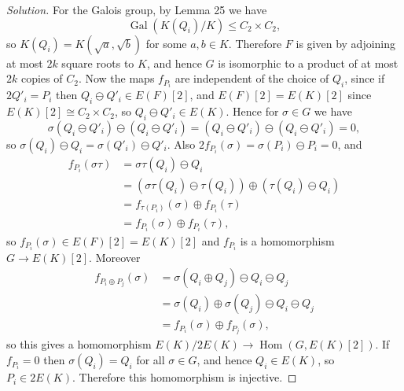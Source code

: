\documentclass[a4paper]{article}
\theoremstyle{definition}
\DeclareMathOperator{\Hom}{Hom}
\DeclareMathOperator{\Gal}{Gal}
\begin{document}
\begin{enumerate}
        \begin{proof}[Solution]
            For the Galois group, by Lemma 25 we have
            \begin{equation*}
                \Gal(K(Q_i)/K)\le C_2\times C_2,
            \end{equation*}
            so $K(Q_i)=K(\sqrt a,\sqrt b)$ for some $a,b\in K$. Therefore $F$ is
            given by adjoining at most $2k$ square roots to $K$, and hence $G$
            is isomorphic to a product of at most $2k$ copies of $C_2$. Now the
            maps $f_{P_i}$ are independent of the choice of $Q_i$, since if
            $2Q'_i=P_i$ then $Q_i\ominus Q'_i\in E(F)[2]$, and $E(F)[2]=E(K)[2]$
            since $E(K)[2]\cong C_2\times C_2$, so $Q_i\ominus Q'_i\in E(K)$.
            Hence for $\sigma\in G$ we have
            \begin{equation*}
                \sigma(Q_i\ominus Q'_i)\ominus(Q_i\ominus Q'_i)
                    = (Q_i\ominus Q'_i)\ominus(Q_i\ominus Q'_i)
                    = 0,
            \end{equation*}
            so $\sigma(Q_i)\ominus Q_i=\sigma(Q'_i)\ominus Q'_i$. Also
            $2f_{P_i}(\sigma)=\sigma(P_i)\ominus P_i=0$, and
            \begin{align*}
                f_{P_i}(\sigma\tau)
                    &= \sigma\tau(Q_i)\ominus Q_i \\
                    &= (\sigma\tau(Q_i)\ominus\tau(Q_i))
                        \oplus (\tau(Q_i)\ominus Q_i) \\
                    &= f_{\tau(P_i)}(\sigma) \oplus f_{P_i}(\tau) \\
                    &= f_{P_i}(\sigma) \oplus f_{P_i}(\tau),
            \end{align*}
            so $f_{P_i}(\sigma)\in E(F)[2]=E(K)[2]$ and $f_{P_i}$ is a
            homomorphism $G\to E(K)[2]$. Moreover
            \begin{align*}
                f_{P_i\oplus P_j}(\sigma)
                    &= \sigma(Q_i\oplus Q_j)\ominus Q_i\ominus Q_j \\
                    &= \sigma(Q_i)\oplus\sigma(Q_j)\ominus Q_i\ominus Q_j \\
                    &= f_{P_i}(\sigma)\oplus f_{P_j}(\sigma),
            \end{align*}
            so this gives a homomorphism $E(K)/2E(K)\to\Hom(G,E(K)[2])$. If
            $f_{P_i}=0$ then $\sigma(Q_i)=Q_i$ for all $\sigma\in G$, and hence
            $Q_i\in E(K)$, so $P_i\in 2E(K)$. Therefore this homomorphism is
            injective.


\end{proof}
\end{enumerate}
\end{document}
